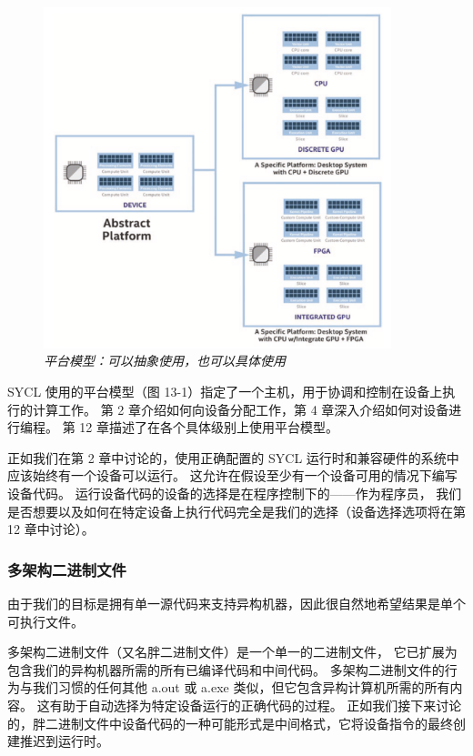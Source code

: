 \begin{figure}[H]
	\centering
	\includegraphics[width=0.9\textwidth]{figs/F13.1.png}
	\caption{\textit{平台模型：可以抽象使用，也可以具体使用 }}
\end{figure}

SYCL 使用的平台模型（图 13-1）指定了一个主机，用于协调和控制在设备上执行的计算工作。 
第 2 章介绍如何向设备分配工作，第 4 章深入介绍如何对设备进行编程。 第 12 章描述了在各个具体级别上使用平台模型。

正如我们在第 2 章中讨论的，使用正确配置的 SYCL 运行时和兼容硬件的系统中应该始终有一个设备可以运行。 
这允许在假设至少有一个设备可用的情况下编写设备代码。 
运行设备代码的设备的选择是在程序控制下的——作为程序员，
我们是否想要以及如何在特定设备上执行代码完全是我们的选择（设备选择选项将在第 12 章中讨论）。

\subsubsection{多架构二进制文件}
由于我们的目标是拥有单一源代码来支持异构机器，因此很自然地希望结果是单个可执行文件。

多架构二进制文件（又名胖二进制文件）是一个单一的二进制文件，
它已扩展为包含我们的异构机器所需的所有已编译代码和中间代码。 
多架构二进制文件的行为与我们习惯的任何其他 a.out 或 a.exe 类似，但它包含异构计算机所需的所有内容。 
这有助于自动选择为特定设备运行的正确代码的过程。 
正如我们接下来讨论的，胖二进制文件中设备代码的一种可能形式是中间格式，它将设备指令的最终创建推迟到运行时。

